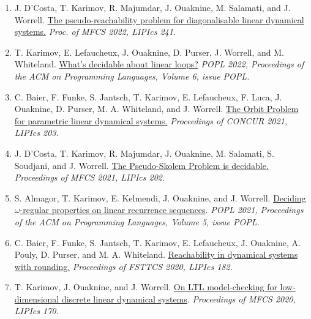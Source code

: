 \documentclass{article}
\begin{document}
\begin{enumerate}
		\item J. D'Costa, T. Karimov, R. Majumdar, J. Ouaknine, M. Salamati, and J. Worrell. 
		\newline \href{https://drops.dagstuhl.de/opus/volltexte/2022/16838/}{The pseudo-reachability problem for diagonalisable linear dynamical systems.}
		\newline\emph{Proc. of MFCS 2022, LIPIcs 241.}
		
		\item T. Karimov, E. Lefaucheux, J. Ouaknine, D. Purser, J. Worrell, and M. Whiteland. 
		\newline \href{https://dl.acm.org/doi/10.1145/3498727}{What's decidable about linear loops?}
		\newline\emph{POPL 2022, Proceedings of the ACM on Programming Languages, Volume 6, issue POPL.}
		
		\item C. Baier, F. Funke, S. Jantsch, T. Karimov, E. Lefaucheux, F. Luca, J. Ouaknine, D. Purser, M. A. Whiteland, and J. Worrell.
		\newline \href{https://people.mpi-sws.org/~joel/publications/semialgebraic-model-checking-LDS21abs.html}{The Orbit Problem for parametric linear dynamical systems.}
		\newline \emph{Proceedings of CONCUR 2021, LIPIcs 203.}
		
		\item J. D'Costa, T. Karimov, R. Majumdar, J. Ouaknine, M. Salamati, S. Soudjani, and J. Worrell.
		\newline \href{https://people.mpi-sws.org/~joel/publications/pseudo-skolem21abs.html}{The Pseudo-Skolem Problem is decidable.}
		\newline \emph{Proceedings of MFCS 2021, LIPIcs 202.}
		
		\item S. Almagor, T. Karimov, E. Kelmendi, J. Ouaknine, and J. Worrell.
		\newline \href{https://people.mpi-sws.org/~joel/publications/omega_LRS21abs.html}{Deciding $\omega$-regular properties on linear recurrence sequences}. 
		\newline
		\emph{POPL 2021, Proceedings of the ACM on Programming Languages, Volume 5, issue POPL.}
		
		\item C. Baier, F. Funke, S. Jantsch, T. Karimov, E. Lefaucheux, J. Ouaknine,
		A. Pouly, D. Purser, and M. A. Whiteland. 
		\newline
		\href{https://people.mpi-sws.org/~joel/publications/dynamical_systems_orbit_rounding20abs.html}{Reachability in dynamical systems with rounding.} 
		\newline \emph{Proceedings of FSTTCS 2020, LIPIcs 182.}
		
		\item T. Karimov, J. Ouaknine, and J. Worrell. 
		\newline \href{https://people.mpi-sws.org/~joel/publications/LTL_discrete_LDS20abs.html}{On LTL model-checking for low-dimensional discrete
			linear dynamical systems}. \newline \emph{Proceedings of MFCS 2020, LIPIcs 170.}
	\end{enumerate}
	
\end{document}
